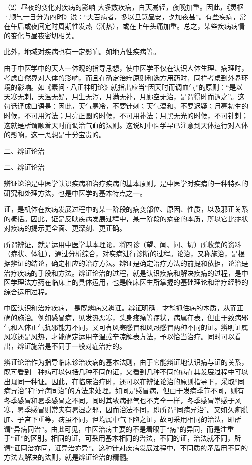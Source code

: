 \documentclass[a4paper,12pt,UTF8,twoside]{ctexbook}
\begin{document}
（2）昼夜的变化对疾病的影响 大多数疾病，白天减轻，夜晚加重。因此，《灵枢·顺气一日分为四时》说：“夫百病者，多以旦慧昼安，夕加夜甚”。有些疾病，常在午后或夜间定时周期性发热（潮热），或在上午头痛加重。总之，某些疾病病情的变化与昼夜密切相关。

此外，地域对疾病也有一定影响。如地方性疾病等。

由于中医学中的天人一体观的指导思想，使中医学不仅在认识人体生理、病理时，考虑自然界对人体的影响，而且在确定治疗原则和选方用药时，同样考虑到外界环境的影响。如《素问·八正神明论》就指出应当“因天时而调血气”的原则：“是以天寒无刺，天温无疑，月生无泻，月满无补，月廊空无治，是谓得时而调之”。这句话译成口语是：因此，天气寒冷，不要针刺；天气温和，不要迟疑；月亮初生的时候，不可用泻法；月亮正圆的时候，不可用补法；月黑无光的时候，不可针刺；这就是所谓顺着天时而调治气血的法则。这说明中医学早已注意到天体运行对人体的影响，这一思想是十分宝贵的。

二、辨证论治

二、辨证论治

辨证论治是中医学认识疾病和治疗疾病的基本原则，是中医学对疾病的一种特殊的研究和处理方法，也是中医学的基本特点之一。

证，是机体在疾病发展过程中的某一阶段的病变部位、原因、性质，以及邪正关系的概括。因此，证是反映疾病发展过程中，某一阶段的病变的本质，所以它比症状对疾病的揭示更全面、更深刻、更正确。

所谓辨证，就是运用中医学基本理论，将四诊（望、闻、问、切）所收集的资料（症状、体征），通过分析综合，对疾病进行诊断的过程。论治，又称施治，是根据辨证的结论，确定相应的治疗方法。辨证是确定治疗方法的前提和依据，论治是治疗疾病的手段和方法。辨证论治的过程，就是认识疾病和解决疾病的过程，是中医学理法方药在临床上的具体运用，也是临床医生所掌握的基础理论和治疗经验的综合运用过程。

中医认识和治疗疾病， 是既辨病又辨证。辨证明确，才能抓住病的本质，从而正确的施治。例如感冒病，见发热恶寒，头身疼痛等症状，病属在表，但由于致病邪气和人体正气抗邪能力不同，又可有风寒感冒和风热感冒两种不同的证。辨明证属风寒还是风热，才能确定运用辛温或辛凉解表方法，予以恰当治疗。同时可以看出，辨证施治是不同于一般对症治疗的。

辨证论治作为指导临床诊治疾病的基本法则，由于它能辩证地认识病与证的关系，既可看到一种病可以包括几种不同的证，又看到几种不同的病在其发展过程中可以出现同一种证。因此，在临床治疗时，还可以在辨证论治的原则指导下，采取“同病异治”和“异病同治”的方法来处理。如同是感冒病，但由于发病季节不同，则有冬季感冒和暑季感冒之不同，同时其致病邪气也不完全一样，冬季感冒常感于风寒，暑季感冒则常夹有暑湿之邪，因而治法不同，即所谓“同病异治”。又如久痢脱肛、子宫下垂等，病虽不同，但均属中气下陷之证，故可采用相同的治法，即所谓“异病同治”。由此可见，中医治病主要的不是着眼于“病”的异同，而是注重于“证”的区别。相同的证，可采用基本相同的治法，不同的证，治法就不同，所谓“证同治亦同，证异治亦异”。这种针对疾病发展过程中，不同质的矛盾用不同的方法去解决的法则，就是辨证论治的精髓。
\end{document}
